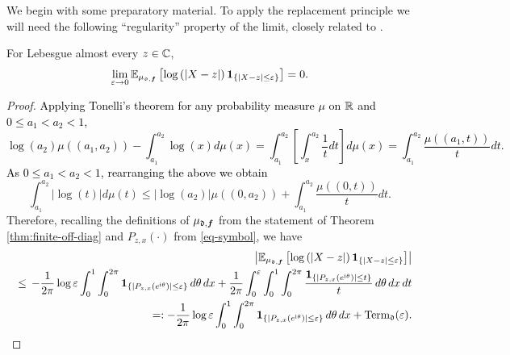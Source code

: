 \documentclass{amsart}
\numberwithin{equation}{section}
\def\corOZ{}
\def\corABrev{\textcolor{black}}
\newcommand{\abbr}[1]{{\sc\lowercase{#1}}}
\begin{document}
We begin with some preparatory material.
To apply the replacement principle
we will need the following ``regularity'' property of the limit,
closely related to \cite[Definition 1]{GWZ}.
\begin{lemma}\label{lem:regular}
For Lebesgue almost every $z \in \mathbb{C}$,
\[
  \lim_{\varepsilon \to 0} \mathbb E_{\mu_{\mathfrak{d},{\bm f}}} \left[ \log \left(\left|X - z\right|\right) {\bf 1}_{\{|X - z| \le \varepsilon\}}\right] = 0.
\]
\end{lemma}
\begin{proof}
\corABrev{Applying Tonelli's theorem for any probability measure $\mu$ on $\mathbb{R}$ and $0 \le
a_1 < a_2 <1$,
\[
\log(a_2) \mu((a_1,a_2)) - \int_{a_1}^{a_2} \log(x) d\mu(x) = \int_{a_1}^{a_2} \left[ \int_{x}^{a_2} \frac{1}{t} dt\right] d\mu(x) = \int_{a_1}^{a_2}\frac{\mu((a_1,t))}{t} dt.
\]
As $0 \le a_1 < a_2 < 1$, rearranging the above we obtain}
\[
\int_{a_1}^{a_2} |\log(t)| d\mu(t) \le |\log(a_2)| \mu((0,a_2)) + \int_{a_1}^{a_2} \frac{\mu((0,t))}{t}dt.
\]
Therefore, recalling the definitions of $\mu_{\mathfrak{d},{\bm f}}$
\corOZ{from the statement of Theorem \ref{thm:finite-off-diag}
and $P_{z,x}(\cdot)$ from \eqref{eq-symbol}}, we have
\begin{eqnarray}
&&\left|\mathbb E_{\mu_{\mathfrak{d},{\bm f}}} \left[ \log \left(\left|X - z\right|\right)
{\bf 1}_{\{|X - z| \le \varepsilon\}}
\right] \right|\nonumber \\
&&\le \,
-\frac{1}{2 \pi}\log \varepsilon \int_0^1 \int_0^{2 \pi}
{\bf 1}_{ \{|P_{z,x}(e^{\mathrm{i} \theta})| \le \varepsilon\}}
\, d\theta \, d x
  + \frac{1}{2 \pi}\int_0^\varepsilon \int_0^1 \int_0^{2 \pi} \frac{
  {\bf 1}_{\{ |P_{z,x}(e^{\mathrm{i} \theta})| \le t\}}}{t} \, d\theta \, d x \, dt\nonumber\\
  &&=:
-\frac{1}{2 \pi}\log \varepsilon \int_0^1 \int_0^{2 \pi}
{\bf 1}_{ \{|P_{z,x}(e^{\mathrm{i} \theta})| \le \varepsilon\}}
\, d\theta \, d x
+\mathrm{Term}_{\mathfrak{d}}(\varepsilon).
   \label{eq:log-bound-1}
\end{eqnarray}
%

\end{proof}
\end{document}

